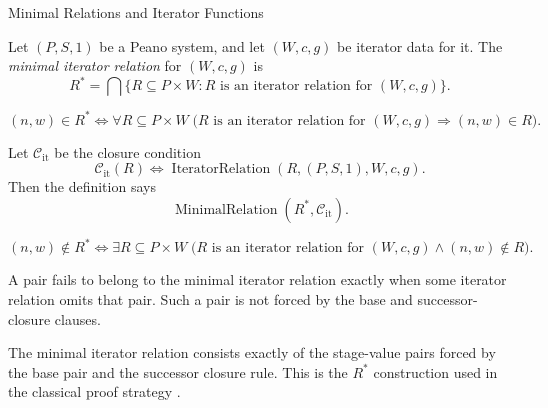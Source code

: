 \begin{topicbox}{Minimal Relations and Iterator Functions}
\begin{tcolorbox}[colback=defbox, colframe=defborder, arc=2pt,
  left=6pt, right=6pt, top=4pt, bottom=4pt,
  title={\small\textbf{Definition (Minimal Iterator Relation)}},
  fonttitle=\small\bfseries]
\begin{definition}
\label{def:minimal-iterator-relation}
Let $(P,S,1)$ be a Peano system, and let $(W,c,g)$ be iterator data for it.
The \emph{minimal iterator relation} for $(W,c,g)$ is
\[
R^*
=
\bigcap\{R\subseteq P\times W : R \text{ is an iterator relation for }
(W,c,g)\}.
\]
\end{definition}
\end{tcolorbox}

\begin{remark*}
\[
(n,w)\in R^*
\Longleftrightarrow
\forall R\subseteq P\times W\;
\bigl(R \text{ is an iterator relation for } (W,c,g)
\Longrightarrow (n,w)\in R\bigr).
\]
\end{remark*}

\begin{remark*}
Let $\mathcal C_{\mathrm{it}}$ be the closure condition
\[
\mathcal C_{\mathrm{it}}(R)
\Longleftrightarrow
\operatorname{IteratorRelation}(R,(P,S,1),W,c,g).
\]
Then the definition says
\[
\operatorname{MinimalRelation}(R^*,\mathcal C_{\mathrm{it}}).
\]
\end{remark*}

\begin{remark*}
\[
(n,w)\notin R^*
\Longleftrightarrow
\exists R\subseteq P\times W\;
\bigl(R \text{ is an iterator relation for } (W,c,g)\land (n,w)\notin R\bigr).
\]
\end{remark*}

\begin{remark*}
A pair fails to belong to the minimal iterator relation exactly when some
iterator relation omits that pair. Such a pair is not forced by the base and
successor-closure clauses.
\end{remark*}

\begin{remark*}[Interpretation]
The minimal iterator relation consists exactly of the stage-value pairs forced
by the base pair and the successor closure rule. This is the $R^*$ construction
used in the classical proof strategy
\citep{feferman1964numbersystems,hrbacek_jech1999,chi_recursion_wustl}.
\end{remark*}


\end{topicbox}
